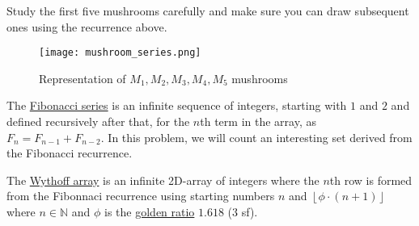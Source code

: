 \documentclass[addpoints]{exam}
\begin{document}
\begin{questions}
Study the first five mushrooms carefully and make sure you can draw subsequent ones using the recurrence above.

\begin{figure}[h]
  \centering
  \texttt{[image: mushroom\_series.png]}
  \caption{Representation of $M_1,M_2,M_3,M_4,M_5$ mushrooms}
  \label{fig:mushroom_series}
\end{figure}


\question
    The \href{https://en.wikipedia.org/wiki/Fibonacci_number}{Fibonacci series} is an infinite sequence of integers, starting with $1$ and $2$ and defined recursively after that, for the $n$th term in the array, as $F_n = F_{n-1} + F_{n-2}$. In this problem, we will count an interesting set derived from the Fibonacci recurrence.
    
The \href{http://www.maths.surrey.ac.uk/hosted-sites/R.Knott/Fibonacci/fibGen.html#section6.2}{Wythoff array} is an infinite 2D-array of integers where the $n$th row is formed from the Fibonnaci recurrence using starting numbers $n$ and $\left \lfloor{\phi\cdot (n+1)}\right \rfloor$ where $n \in \mathbb{N}$ and $\phi$ is the \href{https://en.wikipedia.org/wiki/Golden_ratio}{golden ratio} $1.618$ (3 sf).


\end{questions}
\end{document}
